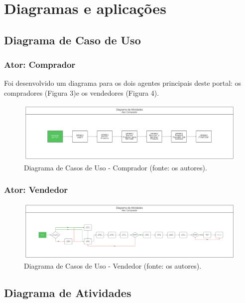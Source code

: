 \documentclass[
	12pt,				%
	openright,			%
	twoside,			%
	a4paper,			%
	english,			%
	brazil				%
	]{abntex2}
\begin{document}
\chapter{Diagramas e aplicações}\label{cap_diagama_de_aplicacoes}

\section{Diagrama de Caso de Uso}

\subsection{Ator: Comprador}

Foi desenvolvido um diagrama para os dois agentes principais deste portal: os compradores (Figura 3)e os vendedores (Figura 4).

\begin{figure}[htb]
	\centering
	\includegraphics[width=1\textwidth]{img/Diagrama de atividades comprador}
	\caption{Diagrama de Casos de Uso - Comprador (fonte: os autores).}
	\label{fig:diagrama-de-casos-comprador}
\end{figure}

\subsection{Ator: Vendedor}

\begin{figure}[htb]
	\centering
	\includegraphics[width=1\textwidth]{img/Diagrama de Atividades Vendedor}
	\caption{Diagrama de Casos de Uso - Vendedor (fonte: os autores).}
	\label{fig:diagrama-de-casos-vendedor}
\end{figure}


\section{Diagrama de Atividades}
\end{document}
